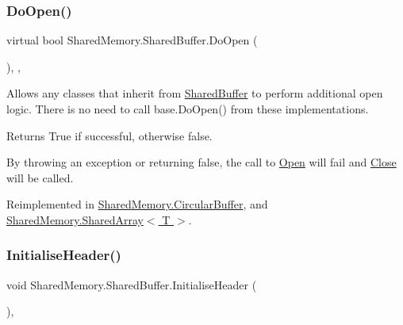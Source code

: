 \mbox{\label{class_shared_memory_1_1_shared_buffer_ae91f81f088cebf1bca375bfe0cb48d6e}} 
\subsubsection{\texorpdfstring{Do\+Open()}{DoOpen()}}
{\footnotesize\ttfamily virtual bool Shared\+Memory.\+Shared\+Buffer.\+Do\+Open (\begin{DoxyParamCaption}{ }\end{DoxyParamCaption})\hspace{0.3cm}{\ttfamily [inline]}, {\ttfamily [protected]}, {\ttfamily [virtual]}}



Allows any classes that inherit from \hyperlink{class_shared_memory_1_1_shared_buffer}{Shared\+Buffer} to perform additional open logic. There is no need to call base.\+Do\+Open() from these implementations. 

\begin{DoxyReturn}{Returns}
True if successful, otherwise false.
\end{DoxyReturn}


By throwing an exception or returning false, the call to \hyperlink{class_shared_memory_1_1_shared_buffer_abf7e37d0b654ad76bcfca63543766445}{Open} will fail and \hyperlink{class_shared_memory_1_1_shared_buffer_a137e5d49a530fd990c6d22d30b92250a}{Close} will be called.

Reimplemented in \hyperlink{class_shared_memory_1_1_circular_buffer_aff62bc6b9dbca60658ab979762dd073d}{Shared\+Memory.\+Circular\+Buffer}, and \hyperlink{class_shared_memory_1_1_shared_array_ac6a9a9606b9287538a148eb3175f7562}{Shared\+Memory.\+Shared\+Array$<$ T $>$}.

\mbox{\label{class_shared_memory_1_1_shared_buffer_a13327700d0b6f45870c127f98f36d159}} 
\subsubsection{\texorpdfstring{Initialise\+Header()}{InitialiseHeader()}}
{\footnotesize\ttfamily void Shared\+Memory.\+Shared\+Buffer.\+Initialise\+Header (\begin{DoxyParamCaption}{ }\end{DoxyParamCaption})\hspace{0.3cm}{\ttfamily [inline]}, {\ttfamily [protected]}}



